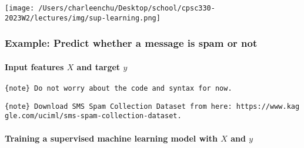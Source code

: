 \documentclass[11pt]{article}
\begin{document}
\texttt{[image: /Users/charleenchu/Desktop/school/cpsc330-2023W2/lectures/img/sup-learning.png]}

    \subsubsection{Example: Predict whether a message is spam or
not}\label{example-predict-whether-a-message-is-spam-or-not}

    \paragraph{\texorpdfstring{Input features \(X\) and target
\(y\)}{Input features X and target y}}\label{input-features-x-and-target-y}

    \texttt{\{note\}\ Do\ not\ worry\ about\ the\ code\ and\ syntax\ for\ now.}

    \texttt{\{note\}\ Download\ SMS\ Spam\ Collection\ Dataset\ from\ here:\ https://www.kaggle.com/uciml/sms-spam-collection-dataset.}

    \paragraph{\texorpdfstring{Training a supervised machine learning model
with \(X\) and
\(y\)}{Training a supervised machine learning model with X and y}}\label{training-a-supervised-machine-learning-model-with-x-and-y}
\end{document}
